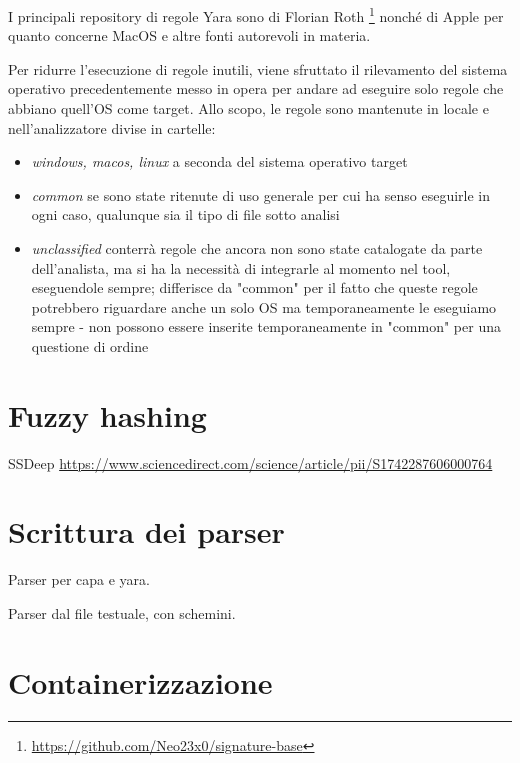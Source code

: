 I principali repository di regole Yara sono di Florian Roth
\footnote{\url{https://github.com/Neo23x0/signature-base}}
nonché di Apple per quanto concerne MacOS e altre fonti autorevoli in materia.

Per ridurre l'esecuzione di regole inutili, viene sfruttato il rilevamento del sistema operativo precedentemente messo in opera per andare ad eseguire solo regole che abbiano quell'OS come target.
Allo scopo, le regole sono mantenute in locale e nell'analizzatore divise in cartelle:
\begin{itemize}
    \item \emph{windows, macos, linux} a seconda del sistema operativo target
    \item \emph{common} se sono state ritenute di uso generale per cui ha senso eseguirle in ogni caso, qualunque sia il tipo di file sotto analisi
    \item \emph{unclassified} conterrà regole che ancora non sono state catalogate da parte dell'analista, ma si ha la necessità di integrarle al momento nel tool, eseguendole sempre; differisce da "common" per il fatto che queste regole potrebbero riguardare anche un solo OS ma temporaneamente le eseguiamo sempre - non possono essere inserite temporaneamente in "common" per una questione di ordine
\end{itemize}

\section{Fuzzy hashing}
SSDeep
\url{https://www.sciencedirect.com/science/article/pii/S1742287606000764}

\section{Scrittura dei parser}
Parser per capa e yara.

Parser dal file testuale, con schemini.

\section{Containerizzazione}
